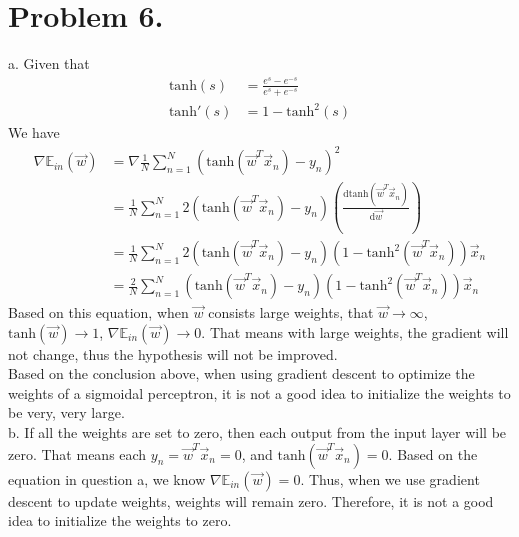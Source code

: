 \documentclass{article}
\begin{document}
    \section*{Problem 6.}
    a. Given that 
    \begin{align*}
        \text{tanh}(s) &= \frac{e^s - e^{-s}}{e^s + e^{-s}}\\
        \text{tanh}'(s) &= 1 - \text{tanh}^2(s)
    \end{align*}
    We have
    \begin{align*}
        \nabla \mathbb{E}_{in}(\overset{\to}{w}) &= 
        \nabla \frac{1}{N} \sum_{n = 1}^{N} (\text{tanh}(\overset{\to}{w}^T \overset{\to}{x}_n) - y_n)^2\\
        &= \frac{1}{N} \sum_{n = 1}^{N} 2 (\text{tanh}(\overset{\to}{w}^T \overset{\to}{x}_n) - y_n)
        (\frac{\mathrm{d} \text{tanh}(\overset{\to}{w}^T \overset{\to}{x}_n)}
        {\mathrm{d} \overset{\to}{w}})\\
        &= \frac{1}{N} \sum_{n = 1}^{N} 2 (\text{tanh}(\overset{\to}{w}^T \overset{\to}{x}_n) - y_n)
        (1 - \text{tanh}^2(\overset{\to}{w}^T \overset{\to}{x}_n)) \overset{\to}{x}_n\\
        &= \frac{2}{N} \sum_{n = 1}^{N} (\text{tanh}(\overset{\to}{w}^T \overset{\to}{x}_n) - y_n)
        (1 - \text{tanh}^2(\overset{\to}{w}^T \overset{\to}{x}_n)) \overset{\to}{x}_n
    \end{align*}
    Based on this equation, when $\overset{\to}{w}$ consists large weights, that $\overset{\to}{w} \to \infty$, 
    $\text{tanh}(\overset{\to}{w}) \to 1$, $\nabla \mathbb{E}_{in}(\overset{\to}{w}) \to 0$. That means with large 
    weights, the gradient will not change, thus the hypothesis will not be improved.\\
    Based on the conclusion above, when using gradient descent to optimize the weights of a sigmoidal perceptron, 
    it is not a good idea to initialize the weights to be very, very large.\\
    b. If all the weights are set to zero, then each output from the input layer will be zero. That means each 
    $y_n = \overset{\to}{w}^T \overset{\to}{x}_n = 0$, and $\text{tanh}(\overset{\to}{w}^T \overset{\to}{x}_n) = 0$.
    Based on the equation in question a, we know $\nabla \mathbb{E}_{in}(\overset{\to}{w}) = 0$. Thus, when we use
    gradient descent to update weights, weights will remain zero. Therefore, it is not a good idea to initialize the 
    weights to zero.
\end{document}
